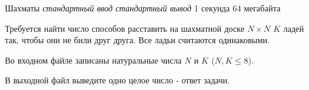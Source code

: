 \begin{problem}%
{Шахматы}%
{\textsl{стандартный ввод}}%
{\textsl{стандартный вывод}}%
{1 секунда}%
{64 мегабайта}{}

Требуется найти число способов расставить на шахматной доске $N \times N$ $K$ ладей так, чтобы они не били друг друга. Все ладьи считаются одинаковыми.

\InputFile

Во входном файле записаны натуральные числа $N$ и $K$ ($N, K \le 8$).

\OutputFile

В выходной файл выведите одно целое число - ответ задачи.

\Examples

\begin{example}
%
\end{example}
\end{problem}
